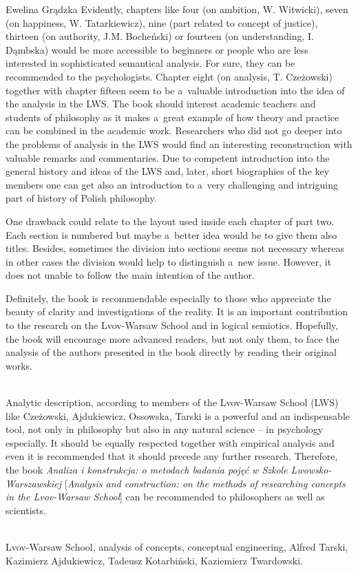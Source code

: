 \begin{newrevengenv}{Ewelina Grądzka}
Evidently, chapters like four (on ambition, W. Witwicki), seven (on happiness, W. Tatarkiewicz), nine (part related to concept of justice), thirteen (on authority, J.M. Bocheński) or fourteen (on understanding, I. Dąmbska) would be more accessible to beginners or people who are less interested in sophisticated semantical analysis. For sure, they can be recommended to the psychologists. Chapter eight (on analysis, T. Czeżowski) together with chapter fifteen seem to be a~valuable introduction into the idea of the analysis in the LWS. The book should interest academic teachers and students of philosophy as it makes a~great example of how theory and practice can be combined in the academic work. Researchers who did not go deeper into the problems of analysis in the LWS would find an interesting reconstruction with valuable remarks and commentaries. Due to competent introduction into the general history and ideas of the LWS and, later, short biographies of the key members one can get also an introduction to a~very challenging and intriguing part of history of Polish philosophy.

One drawback could relate to the layout used inside each chapter of part two. Each section is numbered but maybe a~better idea would be to give them also titles. Besides, sometimes the division into sections seems not necessary whereas in other cases the division would help to distinguish a~new issue. However, it does not unable to follow the main intention of the author.

Definitely, the book is recommendable especially to those who appreciate the beauty of clarity and investigations of the reality. It is an important contribution to the research on the Lvov-Warsaw School and in logical semiotics. Hopefully, the book will encourage more advanced readers, but not only them, to face the analysis of the authors presented in the book directly by reading their original works.







\vspace{15mm}%
{}\\
{Analytic description, according to members of the Lvov-Warsaw School (LWS) like Czeżowski, Ajdukiewicz, Ossowska, Tarski is a powerful and an indispensable tool, not only in philosophy but also in any natural science – in psychology especially. It should be equally respected together with empirical analysis and even it is recommended that it should precede any further research. Therefore, the book \textit{Analiza i konstrukcja: o metodach badania pojęć w Szkole Lwowsko-Warszawskiej} [\textit{Analysis and construction: on the methods of researching concepts in the Lvov-Warsaw School}] can be recommended to philosophers as well as scientists.}\par%
\vspace{2mm}%
{}\\
{Lvov-Warsaw School, analysis of concepts, conceptual engineering, Alfred Tarski, Kazimierz Ajdukiewicz, Tadeusz Kotarbiński, Kaziemierz Twardowski.}%



\end{newrevengenv}
